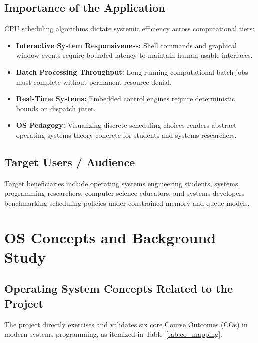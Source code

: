 \documentclass[12pt,a4paper]{report}
\begin{document}
\section{Importance of the Application}
CPU scheduling algorithms dictate systemic efficiency across computational tiers:
\begin{itemize}[leftmargin=1.5em, itemsep=2pt]
  \item \textbf{Interactive System Responsiveness:} Shell commands and graphical window events require bounded latency to maintain human-usable interfaces.
  \item \textbf{Batch Processing Throughput:} Long-running computational batch jobs must complete without permanent resource denial.
  \item \textbf{Real-Time Systems:} Embedded control engines require deterministic bounds on dispatch jitter.
  \item \textbf{OS Pedagogy:} Visualizing discrete scheduling choices renders abstract operating systems theory concrete for students and systems researchers.
\end{itemize}

\section{Target Users / Audience}
Target beneficiaries include operating systems engineering students, systems programming researchers, computer science educators, and systems developers benchmarking scheduling policies under constrained memory and queue models.

\chapter{OS Concepts and Background Study}\label{ch2}

\section{Operating System Concepts Related to the Project}
The project directly exercises and validates six core Course Outcomes (COs) in modern systems programming, as itemized in Table~\ref{tab:co_mapping}.
\end{document}
